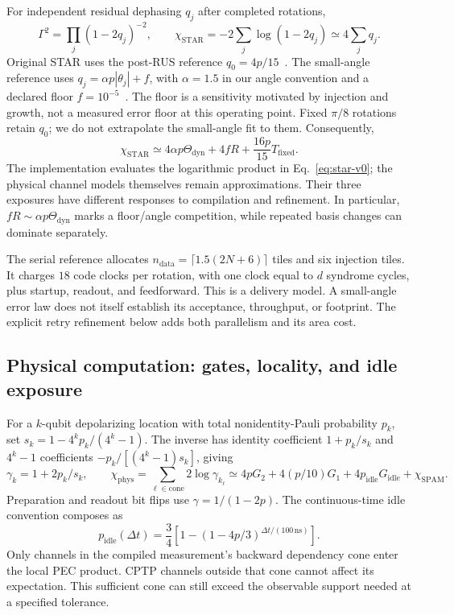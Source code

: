 \documentclass[11pt]{article}
\begin{document}
For independent residual dephasing $q_j$ after completed rotations,
\begin{equation}\label{eq:star-v0}
 \Gamma^2=\prod_j(1-2q_j)^{-2},\qquad
 \chi_{\mathrm{STAR}}=-2\sum_j\log(1-2q_j)\simeq4\sum_jq_j.
\end{equation}
Original STAR uses the post-RUS reference $q_0=4p/15$~\cite{akahoshi}.
The small-angle reference uses $q_j=\alpha p|\theta_j|+f$, with
$\alpha=1.5$ in our angle convention and a declared floor $f=10^{-5}$~\cite{toshio,chung}. The floor is a sensitivity motivated by injection and
growth, not a measured error floor at this operating point. Fixed $\pi/8$
rotations retain $q_0$; we do not extrapolate the small-angle fit to them.
Consequently,
\begin{equation}\label{eq:star-exposure}
 \chi_{\mathrm{STAR}}\simeq4\alpha p\Theta_{\mathrm{dyn}}+4fR
                     +\frac{16p}{15}T_{\mathrm{fixed}}.
\end{equation}
The implementation evaluates the logarithmic product in Eq.~\eqref{eq:star-v0};
the physical channel models themselves remain approximations. Their three
exposures have different responses to compilation and refinement. In
particular, $fR\sim\alpha p\Theta_{\mathrm{dyn}}$ marks a floor/angle
competition, while repeated basis changes can dominate separately.

The serial reference allocates
$n_{\mathrm{data}}=\lceil1.5(2N+6)\rceil$ tiles and six injection tiles.
It charges $18$ code clocks per rotation, with one clock equal to $d$
syndrome cycles, plus startup, readout, and feedforward. This is a delivery
model. A small-angle error law does not itself establish its acceptance,
throughput, or footprint. The explicit retry refinement below adds both
parallelism and its area cost.

\subsection{Physical computation: gates, locality, and idle exposure}
For a $k$-qubit depolarizing location with total nonidentity-Pauli probability
$p_k$, set $s_k=1-4^kp_k/(4^k-1)$. The inverse has identity coefficient
$1+p_k/s_k$ and $4^k-1$ coefficients $-p_k/[(4^k-1)s_k]$, giving
\begin{equation}\label{eq:physical}
 \gamma_k=1+2p_k/s_k,\qquad
 \chi_{\mathrm{phys}}=\sum_{\ell\in\mathrm{cone}}2\log\gamma_{k_\ell}
 \simeq4pG_2+4(p/10)G_1+4p_{\mathrm{idle}}G_{\mathrm{idle}}+\chi_{\mathrm{SPAM}}.
\end{equation}
Preparation and readout bit flips use $\gamma=1/(1-2p)$. The continuous-time
idle convention composes as
\begin{equation}
 p_{\mathrm{idle}}(\Delta t)=\frac34
 \left[1-(1-4p/3)^{\Delta t/(100\,\mathrm{ns})}\right].
\end{equation}
Only channels in the compiled measurement's backward dependency cone enter
the local PEC product. CPTP channels outside that cone cannot affect its
expectation. This sufficient cone can still exceed the observable support
needed at a specified tolerance.
\end{document}
